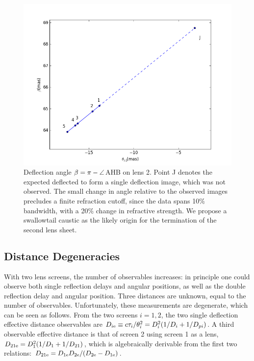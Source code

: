 \documentclass[useAMS,usenatbib]{mn2e}
\begin{document}
\begin{figure}
\centering
\includegraphics[width=1.0\linewidth]{Reflection_angle.png}
\caption{Deflection angle $\beta=\pi-\protect\angle$AHB on lens 2.  Point J denotes the expected
  deflected to form a single deflection image, which was not
  observed.   The small change in angle relative to the observed
  images precludes a finite refraction cutoff, since the data spans
  10\% bandwidth, with a 20\% change in refractive strength.  We
  propose a swallowtail caustic as the likely origin for the
  termination of the second lens sheet.
}
\label{vtrans}
\end{figure}

\subsection{Distance Degeneracies}
\label{sec:degeneracy}
With two lens screens, the number of observables increases: in
principle one could observe both single reflection delays and angular
positions, as well as the double reflection delay and angular
position.  Three distances are unknown, equal to the number of
observables.  Unfortunately, these measurements are degenerate, which
can be seen as follows. From the two screens $i=1,2$, the two single
deflection effective distance observables are
$D_{i{\rm e}} \equiv c\tau_i/\theta_i^2=D_i^2(1/D_i+1/D_{pi})$.  A third
observable effective distance is that of screen 2 using screen 1 as a
lens, $D_{21{\rm e}}=D_1^2(1/D_1+1/D_{21})$, which is algebraically
derivable from the first two relations:
$D_{{21}{\rm e}}=D_{1{\rm e}}D_{2{\rm e}}/(D_{2{\rm e}}-D_{1{\rm e}})$.  
\end{document}
